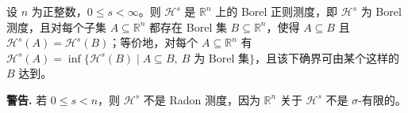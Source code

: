\documentclass[../../main.tex]{subfiles}%
\begin{document}
\begin{theorem}\label{theorem:ch02-2-1}
设 $n$ 为正整数，$0\leqslant s<\infty$。则 $\mathcal{H}^s$ 是 $\mathbb{R}^n$ 上的 Borel 正则测度，即 $\mathcal{H}^s$ 为 Borel 测度，且对每个子集 $A\subseteq\mathbb{R}^n$ 都存在 Borel 集 $B\subseteq\mathbb{R}^n$，使得 $A\subseteq B$ 且 $\mathcal{H}^s(A)=\mathcal{H}^s(B)$；等价地，对每个 $A\subseteq\mathbb{R}^n$ 有 $\mathcal{H}^s(A)=\inf\{\mathcal{H}^s(B)\mid A\subseteq B,\ B\text{ 为 Borel 集}\}$，且该下确界可由某个这样的 $B$ 达到。
\end{theorem}

\begin{remark}\label{remark:ch02-thm-2-1-警告}
\textbf{警告.} 若 $0\leqslant s<n$，则 $\mathcal{H}^s$ 不是 Radon 测度，因为 $\mathbb{R}^n$ 关于 $\mathcal{H}^s$ 不是 $\sigma$-有限的。
\end{remark}
\end{document}
